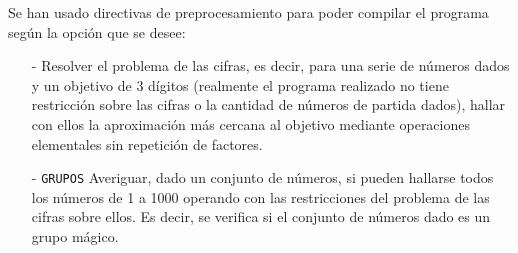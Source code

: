 \documentclass[a4paper,10pt]{scrartcl}
\def\C++#1{\texttt{#1}}
\begin{document}
   Se han usado directivas de preprocesamiento para poder compilar el programa según la opción que se desee:
   \begin{itemize}
    \item [-] Resolver el problema de las cifras, es decir, para una serie de números dados y un objetivo de 3 dígitos
    (realmente el programa realizado no tiene restricción sobre las cifras o la cantidad de números de partida dados), hallar
    con ellos la aproximación más cercana al objetivo mediante operaciones elementales sin repetición de factores.
    \item [-] \C++{GRUPOS} Averiguar, dado un conjunto de números, si pueden hallarse todos los números de 1 a 1000 operando
    con las restricciones del problema de las cifras sobre ellos. Es decir, se verifica si el conjunto de números dado
    es un grupo mágico.
   \end{itemize}

   
   
\end{document}
